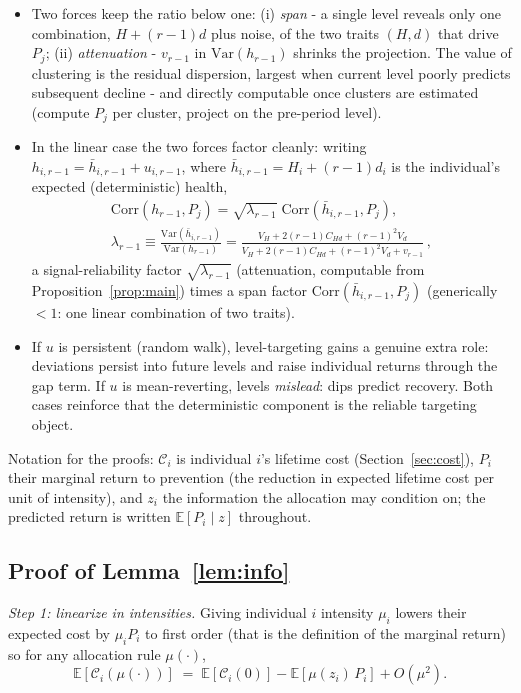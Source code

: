 \documentclass[11pt]{article}
\theoremstyle{remark}
\newcommand{\E}{\mathbb{E}}
\newcommand{\Var}{\mathrm{Var}}
\newcommand{\Corr}{\mathrm{Corr}}
\begin{document}
\begin{itemize}
\item Two forces keep the ratio below one: (i) \emph{span} - a single level reveals only one combination, $H+(r-1)d$ plus noise, of the two traits $(H,d)$ that drive $P_j$; (ii) \emph{attenuation} - $v_{r-1}$ in $\Var(h_{r-1})$ shrinks the projection.
The value of clustering is the residual dispersion, largest when current level poorly predicts subsequent decline - and directly computable once clusters are estimated (compute $P_j$ per cluster, project on the pre-period level).
\item In the linear case the two forces factor cleanly: writing $h_{i,r-1}=\bar h_{i,r-1}+u_{i,r-1}$, where $\bar h_{i,r-1}=H_i+(r-1)d_i$ is the individual's expected (deterministic) health,
\begin{equation}
\begin{gathered}
\Corr(h_{r-1},P_j)=\sqrt{\lambda_{r-1}}\;\Corr(\bar h_{i,r-1},P_j),
\\
\lambda_{r-1}\equiv\frac{\Var(\bar h_{i,r-1})}{\Var(h_{r-1})}
=\frac{V_H+2(r-1)C_{Hd}+(r-1)^2V_d}{V_H+2(r-1)C_{Hd}+(r-1)^2V_d+v_{r-1}}\,,
\end{gathered}
\end{equation}
a signal-reliability factor $\sqrt{\lambda_{r-1}}$ (attenuation, computable from Proposition~\ref{prop:main}) times a span factor $\Corr(\bar h_{i,r-1},P_j)$ (generically $<1$: one linear combination of two traits).
\item If $u$ is persistent (random walk), level-targeting gains a genuine extra role: deviations persist into future levels and raise individual returns through the gap term.
If $u$ is mean-reverting, levels \emph{mislead}: dips predict recovery.
Both cases reinforce that the deterministic component is the reliable targeting object.
\end{itemize}

Notation for the proofs: $\mathcal{C}_i$ is individual $i$'s lifetime cost (Section~\ref{sec:cost}), $P_i$ their marginal return to prevention (the reduction in expected lifetime cost per unit of intensity), and $z_i$ the information the allocation may condition on; the predicted return is written $\E[P_i\mid z]$ throughout.

\subsection*{Proof of Lemma~\ref{lem:info}}

\emph{Step 1: linearize in intensities.} Giving individual $i$ intensity $\mu_i$ lowers their expected cost by $\mu_i P_i$ to first order (that is the definition of the marginal return) so for any allocation rule $\mu(\cdot)$,
\begin{equation}
\E[\mathcal{C}_i(\mu(\cdot))]\;=\;\E[\mathcal{C}_i(0)]-\E[\mu(z_i)\,P_i]+O(\mu^2).
\end{equation}
\end{document}
